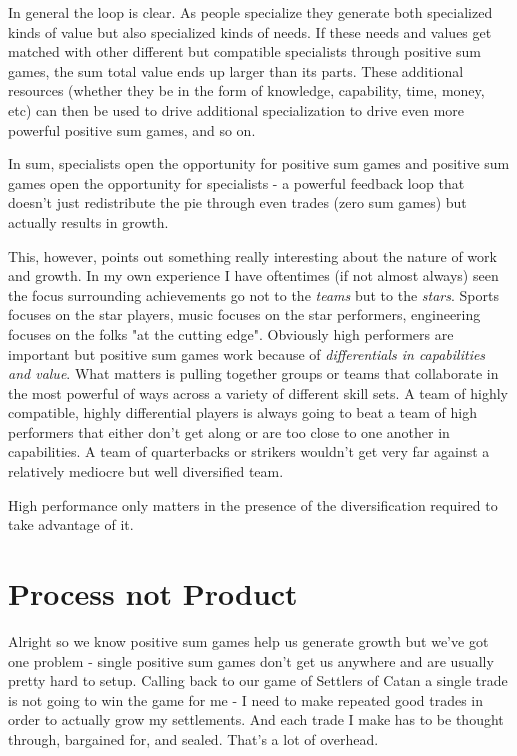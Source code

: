 \documentclass[11pt,a5paper]{book}
\begin{document}
In general the loop is clear. As people specialize they generate both specialized kinds of value but also specialized kinds of needs. If these needs and values get matched with other different but compatible specialists through positive sum games, the sum total value ends up larger than its parts. These additional resources (whether they be in the form of knowledge, capability, time, money, etc) can then be used to drive additional specialization to drive even more powerful positive sum games, and so on. 
\newline

In sum, specialists open the opportunity for positive sum games and positive sum games open the opportunity for specialists - a powerful feedback loop that doesn't just redistribute the pie through even trades (zero sum games) but actually results in growth. 
\newline

This, however, points out something really interesting about the nature of work and growth. In my own experience I have oftentimes (if not almost always) seen the focus surrounding achievements go not to the \textit{teams} but to the \textit{stars}. Sports focuses on the star players, music focuses on the star performers, engineering focuses on the folks "at the cutting edge". Obviously high performers are important but positive sum games work because of \textit{differentials in capabilities and value}. What matters is pulling together groups or teams that collaborate in the most powerful of ways across a variety of different skill sets. A team of highly compatible, highly differential players is always going to beat a team of high performers that either don't get along or are too close to one another in capabilities. A team of quarterbacks or strikers wouldn't get very far against a relatively mediocre but well diversified team. 
\newline

High performance only matters in the presence of the diversification required to take advantage of it.

\section{Process not Product}
Alright so we know positive sum games help us generate growth but we've got one problem - single positive sum games don't get us anywhere and are usually pretty hard to setup. Calling back to our game of Settlers of Catan a single trade is not going to win the game for me - I need to make repeated good trades in order to actually grow my settlements. And each trade I make has to be thought through, bargained for, and sealed. That's a lot of overhead. 
\newline
\end{document}

